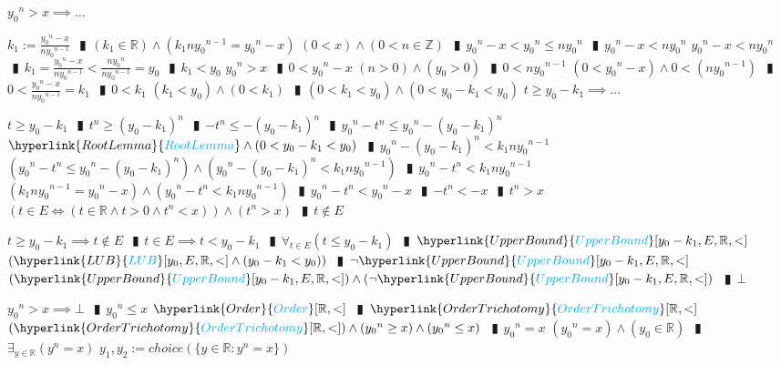 \documentclass{book}
\newcommand{\rf}[1]{\hyperlink{#1}{\textcolor{cyan}{#1}}}
\newcommand{\abr}{:=}
\newcommand{\pipe}{$\phantom{(}\vrectangleblack\phantom{)}$}
\begin{document}
\begin{enumerate}
\begin{enumerate}
    \lit ${y_0}^n > x \implies \ldots$
    \begin{enumerate}
      \lit $k_1 \abr \frac{{y_0}^n - x}{n {y_0}^{n - 1}}$ \pipe $(k_1 \in \mathbb{R}) \land (k_1 n {y_0}^{n - 1} = {y_0}^n - x)$
      \lit $(0 < x) \land (0 < n \in \mathbb{Z})$ \pipe ${y_0}^n - x < {y_0}^n \leq n {y_0}^n$ \pipe ${y_0}^n - x < n {y_0}^n$
      \lit ${y_0}^n - x < n {y_0}^n$ \pipe $k_1 = \frac{{y_0}^n - x}{n {y_0}^{n - 1}} < \frac{n {y_0}^n}{n {y_0}^{n - 1}} = y_0$ \pipe $k_1 < y_0$
      \lit ${y_0}^n > x$ \pipe $0 < {y_0}^n - x$
      \lit $(n > 0) \land (y_0 > 0)$ \pipe $0 < n {y_0}^{n - 1}$
      \lit $(0 < {y_0}^n - x) \land 0 < (n {y_0}^{n - 1})$ \pipe $0 < \frac{{y_0}^n - x}{n {y_0}^{n - 1}} = k_1$ \pipe $0 < k_1$
      \lit $(k_1 < y_0) \land (0 < k_1)$ \pipe $(0 < k_1 < y_0) \land (0 < y_0 - k_1 < y_0)$
      \lit $t \geq y_0 - k_1 \implies \ldots$
      \begin{enumerate}
        \lit $t \geq y_0 - k_1$ \pipe $t^n \geq (y_0 - k_1)^n$ \pipe $-t^n \leq -(y_0 - k_1)^n$ \pipe ${y_0}^n - t^n \leq {y_0}^n - (y_0 - k_1)^n$
        \lit $\rf{RootLemma} \land (0 < y_0 - k_1 < y_0)$ \pipe ${y_0}^n - (y_0 - k_1)^n < k_1 n {y_0}^{n - 1}$
        \lit $({y_0}^n - t^n \leq {y_0}^n - (y_0 - k_1)^n) \land ({y_0}^n - (y_0 - k_1)^n < k_1 n {y_0}^{n - 1})$ \pipe ${y_0}^n - t^n < k_1 n {y_0}^{n - 1}$
        \lit $(k_1 n {y_0}^{n - 1} = {y_0}^n - x) \land ({y_0}^n - t^n < k_1 n {y_0}^{n - 1})$ \pipe ${y_0}^n - t^n < {y_0}^n - x$ \pipe $-t^n < -x$ \pipe $t^n > x$
        \lit $(t \in E \iff (t \in \mathbb{R} \land t > 0 \land t^n < x)) \land (t^n > x)$ \pipe $t \notin E$
      \end{enumerate}
      \lit $t \geq y_0 - k_1 \implies t \notin E$ \pipe $t \in E \implies t < y_0 - k_1$ \pipe $\forall_{t \in E}(t \leq y_0 - k_1)$ \pipe $\rf{UpperBound}[y_0 - k_1, E, \mathbb{R}, <]$
      \lit $(\rf{LUB}[y_0, E, \mathbb{R}, <] \land (y_0 - k_1 < y_0))$ \pipe $\lnot \rf{UpperBound}[y_0 - k_1, E, \mathbb{R}, <]$
      \lit $(\rf{UpperBound}[y_0 - k_1, E, \mathbb{R}, <]) \land (\lnot \rf{UpperBound}[y_0 - k_1, E, \mathbb{R}, <])$ \pipe $\bot$
    \end{enumerate}
    \lit ${y_0}^n > x \implies \bot$ \pipe ${y_0}^n \leq x$
    \lit $\rf{Order}[\mathbb{R}, <]$ \pipe $\rf{OrderTrichotomy}[\mathbb{R}, <]$
    \lit $(\rf{OrderTrichotomy}[\mathbb{R}, <]) \land({y_0}^n \geq x) \land ({y_0}^n \leq x)$ \pipe ${y_0}^n = x$
    \lit $({y_0}^n = x) \land (y_0 \in \mathbb{R})$ \pipe $\exists_{y \in \mathbb{R}}(y^n = x)$
    \lit $y_1, y_2 \abr choice(\{y \in \mathbb{R} : y^n = x\})$

\end{enumerate}
\end{enumerate}
\end{document}
